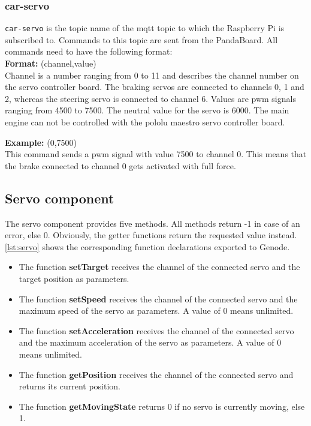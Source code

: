 \subsubsection{car-servo}
\label{sec:mqtt-car-servo}
\texttt{car-servo} is the topic name of the mqtt topic to which the Raspberry Pi is subscribed to. Commands to this topic are sent from the PandaBoard. All commands need to have the following format: \\ 

\textbf{Format:} (channel,value) \\
Channel is a number ranging from 0 to 11 and describes the channel number on the servo controller board. The braking servos are connected to channels 0, 1 and 2, whereas the steering servo is connected to channel 6. Values are pwm signals ranging from 4500 to 7500. The neutral value for the servo is 6000. The main engine can not be controlled with the pololu maestro servo controller board.

\textbf{Example:} (0,7500) \\
This command sends a pwm signal with value 7500 to channel 0. This means that the brake connected to channel 0 gets activated with full force. 




\subsection{Servo component}
\label{sec:comp-servo}

The servo component provides five methods. All methods return -1 in case of an error, else 0. Obviously, the getter functions return the requested value instead.
\autoref{lst:servo} shows the corresponding function declarations exported to Genode.
\begin{itemize}
\item The function \textbf{setTarget} receives the channel of the connected servo and the target position as parameters.
\item The function \textbf{setSpeed} receives the channel of the connected servo and the maximum speed of the servo as parameters. A value of 0 means unlimited.
\item The function \textbf{setAcceleration} receives the channel of the connected servo and the maximum acceleration of the servo as parameters. A value of 0 means unlimited.
\item The function \textbf{getPosition} receives the channel of the connected servo and returns its current position.
\item The function \textbf{getMovingState} returns 0 if no servo is currently moving, else 1.
\end{itemize}

